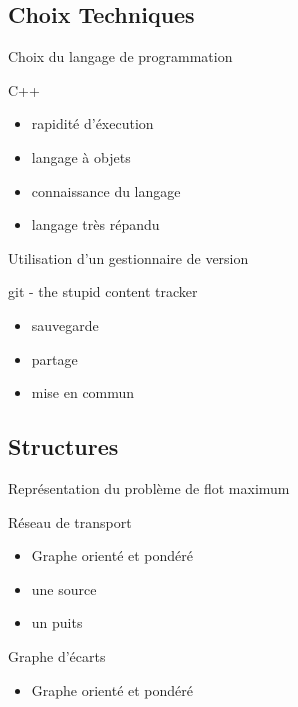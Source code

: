 \subsection{Choix Techniques}

\begin{frame}{Choix du langage de programmation}
	\begin{block}{C++}
  	\begin{itemize}
    	\item rapidité d'éxecution
    	\item langage à objets
    	\item connaissance du langage
    	\item langage très répandu
  	\end{itemize}
	\end{block}
\end{frame}

\begin{frame}{Utilisation d'un gestionnaire de version}
	\begin{block}{git - the stupid content tracker}
  	\begin{itemize}
    	\item sauvegarde
    	\item partage
    	\item mise en commun
  	\end{itemize}
	\end{block}
\end{frame}

\subsection{Structures}
\begin{frame}{Représentation du problème de flot maximum}
	\begin{block}{Réseau de transport}
  	\begin{itemize}
    	\item Graphe orienté et pondéré
    	\item une source
    	\item un puits
  	\end{itemize}
	\end{block}
	\begin{block}{Graphe d'écarts}
  	\begin{itemize}
    	\item Graphe orienté et pondéré
  	\end{itemize}
	\end{block}
\end{frame}


